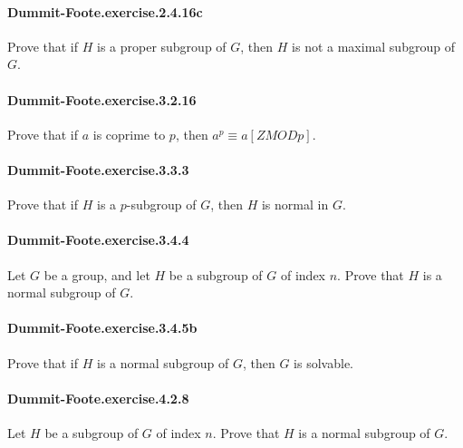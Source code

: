 \documentclass{article}
\begin{document}
\paragraph{Dummit-Foote.exercise.2.4.16c} Prove that if $H$ is a proper subgroup of $G$, then $H$ is not a maximal subgroup of $G$.



\paragraph{Dummit-Foote.exercise.3.2.16} Prove that if $a$ is coprime to $p$, then $a^p \equiv a [ZMOD p]$.

\paragraph{Dummit-Foote.exercise.3.3.3} Prove that if $H$ is a $p$-subgroup of $G$, then $H$ is normal in $G$.

\paragraph{Dummit-Foote.exercise.3.4.4} Let $G$ be a group, and let $H$ be a subgroup of $G$ of index $n$. Prove that $H$ is a normal subgroup of $G$.

\paragraph{Dummit-Foote.exercise.3.4.5b} Prove that if $H$ is a normal subgroup of $G$, then $G$ is solvable.

\paragraph{Dummit-Foote.exercise.4.2.8} Let $H$ be a subgroup of $G$ of index $n$. Prove that $H$ is a normal subgroup of $G$.
\end{document}
